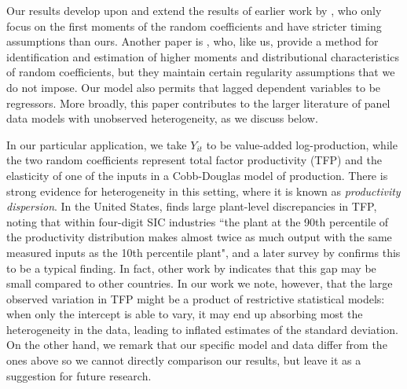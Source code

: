 Our results develop upon and extend the results of earlier work by \cite{graham2012identification}, who only focus on the first moments of the random coefficients and have stricter timing assumptions than ours. Another paper is \cite{arellano2011identifying}, who, like us, provide a method for identification and estimation of higher moments and distributional characteristics of random coefficients, but they maintain certain regularity assumptions that we do not impose.  Our model also permits that lagged dependent variables to be regressors. More broadly, this paper contributes to the larger literature of panel data models with unobserved heterogeneity, as we discuss below.


In our particular application, we take $Y_{it}$ to be value-added log-production, while the two random coefficients represent total factor productivity (TFP) and the elasticity of one of the inputs in a Cobb-Douglas model of production. There is strong evidence for heterogeneity in this setting, where it is known as \emph{productivity dispersion}. In the United States, \cite{syverson2004product} finds large plant-level discrepancies in TFP, noting that within four-digit SIC industries ``the plant at the 90th percentile of the productivity distribution makes almost twice as much output with the same measured inputs as the 10th percentile plant", and a later survey by \cite{syverson2011determines} confirms this to be a typical finding. In fact, other work by \citep{hsieh2009misallocation} indicates that this gap may be small compared to other countries. In our work we note, however, that the large observed variation in TFP might be a product of restrictive statistical models: when only the intercept is able to vary, it may end up absorbing most the heterogeneity in the data, leading to inflated estimates of the standard deviation. On the other hand, we remark that our specific model and data differ from the ones above so we cannot directly comparison our results, but leave it as a suggestion for future research.





